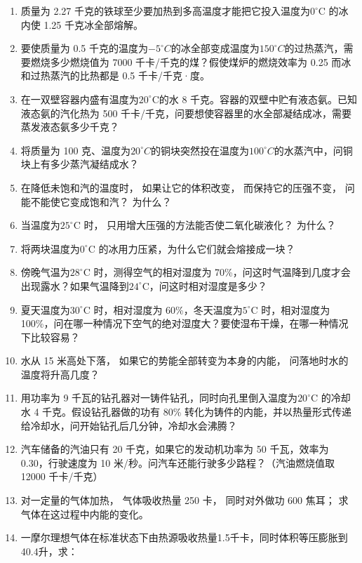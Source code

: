 \begin{enumerate}
\def\labelenumi{\arabic{enumi}.}
\setcounter{enumi}{38}
\item
  质量为 2.27
  千克的铁球至少要加热到多高温度才能把它投入温度为\(0^{\circ}\)C
  的冰内使 1.25 千克冰全部熔解。
\item
  要使质量为 0.5
  千克的温度为\(-5^{\circ}C\)的冰全部变成温度为\(150^{\circ}C\)的过热蒸汽，需要燃烧多少燃烧值为
  7000 千卡/千克的煤？假使煤炉的燃烧效率为 0.25 而冰和过热蒸汽的比热都是
  0.5 千卡/千克·度。
\item
  在一双壁容器内盛有温度为\(20^{\circ} \mathrm{C}\)的水 8
  千克。容器的双壁中贮有液态氨。已知液态氨的汽化热为 500
  千卡/千克，问要想使容器里的水全部凝结成冰，需要蒸发液态氨多少千克？
\item
  将质量为 100
  克、温度为\(20^{\circ}C\)的铜块突然投在温度为\(100^{\circ}C\)的水蒸汽中，问铜块上有多少蒸汽凝结成水？
\item
  在降低未饱和汽的温度时， 如果让它的体积改变， 而保持它的压强不变，
  问能不能使它变成饱和汽？ 为什么？
\item
  当温度为\(25^{\circ}\)C 时， 只用增大压强的方法能否使二氧化碳液化？
  为什么？
\item
  将两块温度为\(0^{\circ}\)C 的冰用力压紧，为什么它们就会熔接成一块？
\item
  傍晚气温为\(28^{\circ}\)C 时，测得空气的相对湿度为
  70\%，问这时气温降到几度才会出现露水？如果气温降到\(24^{\circ}\)C，问这时相对湿度是多少？
\item
  夏天温度为\(30^{\circ}\)C 时，相对湿度为
  60\%，冬天温度为\(5^{\circ}\)C 时，相对湿度为
  100\%，问在哪一种情况下空气的绝对湿度大？要使湿布干燥，在哪一种情况下比较容易？
\item
  水从 15 米高处下落， 如果它的势能全部转变为本身的内能，
  问落地时水的温度将升高几度？
\item
  用功率为 9
  千瓦的钻孔器对一铸件钻孔，同时向孔里倒入温度为\(20^{\circ}\)C 的冷却水
  4 千克。假设钻孔器做的功有 80\%
  转化为铸件的内能，并以热量形式传递给冷却水，问开始钻孔后几分钟，冷却水会沸腾？
\item
  汽车储备的汽油只有 20 千克，如果它的发动机功率为 50 千瓦，效率为
  0.30，行驶速度为 10 米/秒。问汽车还能行驶多少路程？（汽油燃烧值取
  12000 千卡/千克）
\item
  对一定量的气体加热， 气体吸收热量 250 卡， 同时对外做功 600 焦耳；
  求气体在这过程中内能的变化。
\item
  一摩尔理想气体在标准状态下由热源吸收热量1.5千卡，同时体积等压膨胀到40.4升，求：
\end{enumerate}

